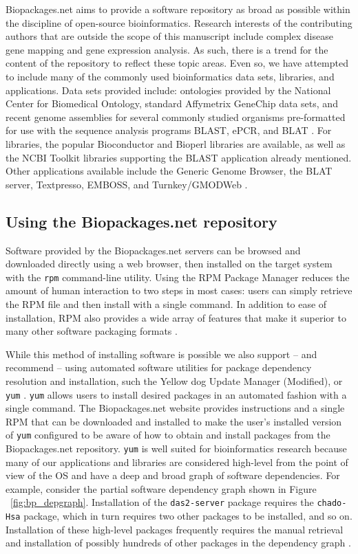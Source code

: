 Biopackages.net aims to provide a software repository as broad as possible
within the discipline of open-source bioinformatics.  Research interests of the
contributing authors that are outside the scope of this manuscript include
complex disease gene mapping and gene expression analysis.  As such, there is a
trend for the content of the repository to reflect these topic areas.  Even so,
we have attempted to include many of the commonly used bioinformatics data
sets, libraries, and applications.  Data sets provided include: ontologies
provided by the National Center for Biomedical Ontology, standard Affymetrix
GeneChip data sets, and recent genome assemblies for several commonly studied
organisms pre-formatted for use with the sequence analysis programs BLAST,
ePCR, and BLAT \cite{ncbo,blast,epcr,blat}.  For libraries, the
popular Bioconductor and Bioperl \cite{bioconductor,bioperl} libraries are
available, as well as the NCBI Toolkit libraries supporting the BLAST
application already mentioned.  Other applications available include the
Generic Genome Browser, the BLAT server, Textpresso, EMBOSS, and Turnkey/GMODWeb
\cite{gbrowse,blat,textpresso,emboss,gmodweb}.

\subsection{Using the Biopackages.net repository}

Software provided by the Biopackages.net servers can be browsed and downloaded
directly using a web browser, then installed on the target system with the
\texttt{rpm} command-line utility.  Using the RPM Package Manager
reduces the amount of human interaction to two steps in most cases: users can
simply retrieve the RPM file and then install with a single command.  In
addition to ease of installation, RPM also provides a wide array of features
that make it superior to many other software packaging formats \cite{hess}.

While this method of installing software is possible we also support -- and
recommend -- using automated software utilities for package dependency
resolution and installation, such the Yellow dog Update Manager (Modified), or
\texttt{yum} \cite{vidal}.  \texttt{yum} allows users to install desired packages in an automated
fashion with a single command.  The Biopackages.net website provides
instructions and a single RPM that can be downloaded and installed to make the
user's installed version of \texttt{yum} configured to be aware of how to obtain and install packages from the Biopackages.net repository.  \texttt{yum} is well
suited for bioinformatics research because many of our applications and
libraries are considered high-level from the point of view of the
OS and have a deep and broad graph of software dependencies.  For example,
consider the partial software dependency graph shown in Figure
~\ref{fig:bp_depgraph}.  Installation of the \texttt{das2-server} package
requires the \texttt{chado-Hsa} package, which in turn requires two other
packages to be installed, and so on.  Installation of these high-level packages
frequently requires the manual retrieval and installation of possibly hundreds
of other packages in the dependency graph \cite{bodnar}.

